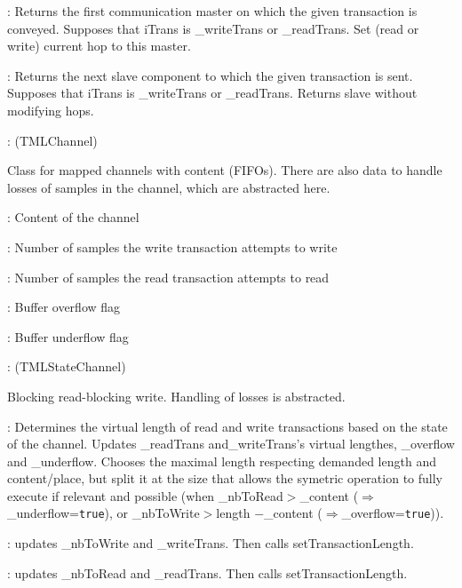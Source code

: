 \documentclass[a4paper,11pt]{article}
\newcommand{\bfont}{\fontseries{b}\selectfont}
\newcommand{\cod}[1]{{\ttfamily #1}}
\newcommand{\class}[2]{\par\vspace{1mm}\hspace{-5mm}\large\colorbox{file}{\textbullet\bfont\cod{#1}:} (\cod{#2})\par}
\newcommand{\method}[1]{\par\vspace{1mm}\hspace{-2mm}\colorbox{method}{\textopenbullet\bfont\cod{#1}:}}
\newcommand{\variable}[1]{\par\vspace{1mm}\hspace{-2mm}\colorbox{variable}{\textopenbullet\bfont\cod{#1}:}}
\begin{document}
\method{getFirstMaster(iTrans)} Returns the first communication master on which the given transaction is conveyed. Supposes that \cod{iTrans} is \cod{\_writeTrans} or \cod{\_readTrans}. Set (read or write) current hop to this master.

\method{getNextSlave(iTrans)} Returns the next slave component to which the given transaction is sent. Supposes that \cod{iTrans} is \cod{\_writeTrans} or \cod{\_readTrans}. Returns slave without modifying hops.

\class{TMLStateChannel}{TMLChannel}
Class for mapped channels with content (FIFOs). There are also data to handle losses of samples in the channel, which are abstracted here.

\variable{\_content} Content of the channel

\variable{\_nbToWrite} Number of samples the write transaction attempts to write

\variable{\_nbToRead} Number of samples the read transaction attempts to read
	
\variable{\_overflow} Buffer overflow flag
	
\variable{\_underflow} Buffer underflow flag
	

\class{TMLbrbwChannel}{TMLStateChannel}
Blocking read-blocking write. Handling of losses is abstracted.
\method{setTransactionLength()} Determines the virtual length of read and write transactions based on the state of the channel. Updates \cod{\_readTrans} and\cod{\_writeTrans}'s virtual lengthes, \cod{\_overflow} and \cod{\_underflow}. Chooses the maximal length respecting demanded length and content/place, but split it at the size that allows the symetric operation to fully execute if relevant and possible (when \cod{\_nbToRead}$>${\_content} ($\Rightarrow$ \cod{\_underflow}={\tt true}), or \cod{\_nbToWrite}$>$\cod{length $-$\_content} ($\Rightarrow$\cod{\_overflow}={\tt true})).

\method{testWrite(iTrans)} updates \cod{\_nbToWrite} and \cod{\_writeTrans}. Then calls \cod{setTransac\-tion\-Length}.

\method{testRead(iTrans)} updates \cod{\_nbToRead} and \cod{\_readTrans}. Then calls \cod{setTransaction\-Length}.
\end{document}
